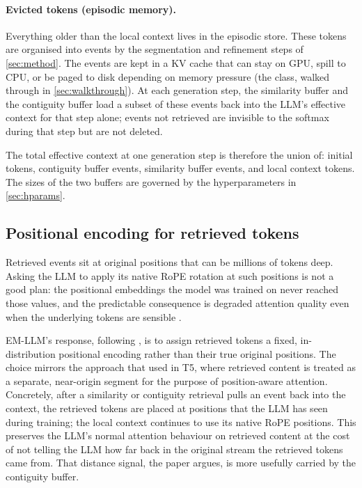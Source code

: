 \paragraph{Evicted tokens (episodic memory).}
Everything older than the local context lives in the episodic store. These tokens are organised into events by the segmentation and refinement steps of \cref{sec:method}. The events are kept in a KV cache that can stay on GPU, spill to CPU, or be paged to disk depending on memory pressure (the  class, walked through in \cref{sec:walkthrough}). At each generation step, the similarity buffer and the contiguity buffer load a subset of these events back into the LLM's effective context for that step alone; events not retrieved are invisible to the softmax during that step but are not deleted.

The total effective context at one generation step is therefore the union of: initial tokens, contiguity buffer events, similarity buffer events, and local context tokens. The sizes of the two buffers are governed by the hyperparameters in \cref{sec:hparams}.

\subsection{Positional encoding for retrieved tokens}
\label{sec:rope-retrieved}

Retrieved events sit at original positions that can be millions of tokens deep. Asking the LLM to apply its native RoPE rotation at such positions is not a good plan: the positional embeddings the model was trained on never reached those values, and the predictable consequence is degraded attention quality even when the underlying tokens are sensible \cite{kazemnejad2024impact,su2024roformer}.

EM-LLM's response, following \textcite{xiao2024infllm}, is to assign retrieved tokens a fixed, in-distribution positional encoding rather than their true original positions. The choice mirrors the approach that \textcite{raffel2020exploring} used in T5, where retrieved content is treated as a separate, near-origin segment for the purpose of position-aware attention. Concretely, after a similarity or contiguity retrieval pulls an event back into the context, the retrieved tokens are placed at positions that the LLM has seen during training; the local context continues to use its native RoPE positions. This preserves the LLM's normal attention behaviour on retrieved content at the cost of not telling the LLM how far back in the original stream the retrieved tokens came from. That distance signal, the paper argues, is more usefully carried by the contiguity buffer.

